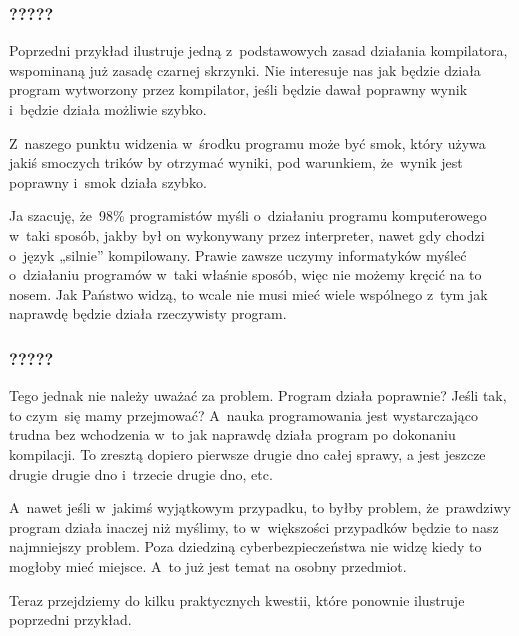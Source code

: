 \documentclass[10pt,t]{beamer}
\begin{document}
\begin{frame}
  \frametitle{?????}


  Poprzedni przykład ilustruje jedną z~podstawowych zasad działania
  kompilatora, wspominaną już zasadę czarnej skrzynki. Nie interesuje nas
  jak będzie działa program wytworzony przez kompilator, jeśli będzie dawał
  poprawny wynik i~będzie działa możliwie szybko.

  Z~naszego punktu widzenia w~środku programu może być smok, który używa
  jakiś smoczych trików by otrzymać wyniki, pod warunkiem, że~wynik jest
  poprawny i~smok działa szybko.

  Ja szacuję, że~98\% programistów myśli o~działaniu programu komputerowego
  w~taki sposób, jakby był on wykonywany przez interpreter, nawet gdy
  chodzi o~język „silnie” kompilowany. Prawie zawsze uczymy informatyków
  myśleć o~działaniu programów w~taki właśnie sposób, więc nie możemy
  kręcić na to nosem. Jak Państwo widzą, to wcale nie musi mieć wiele
  wspólnego z~tym jak \alert{naprawdę} będzie działa \alert{rzeczywisty}
  program.

\end{frame}





\begin{frame}
  \frametitle{?????}


  Tego jednak nie należy uważać za problem. Program działa poprawnie? Jeśli
  tak, to czym~się mamy przejmować? A~nauka programowania jest wystarczająco
  trudna bez wchodzenia w~to jak naprawdę działa program po dokonaniu
  kompilacji. To zresztą dopiero pierwsze drugie dno całej sprawy, a jest
  jeszcze drugie drugie dno i~trzecie drugie dno, etc.

  A~nawet jeśli w~jakimś wyjątkowym przypadku, to byłby problem,
  że~prawdziwy program działa inaczej niż myślimy, to w~większości
  przypadków będzie to nasz najmniejszy problem. Poza dziedziną
  cyberbezpieczeństwa nie widzę kiedy to mogłoby mieć miejsce. A~to już jest
  temat na osobny przedmiot.

  Teraz przejdziemy do kilku praktycznych kwestii, które ponownie ilustruje
  poprzedni przykład.

\end{frame}
\end{document}
